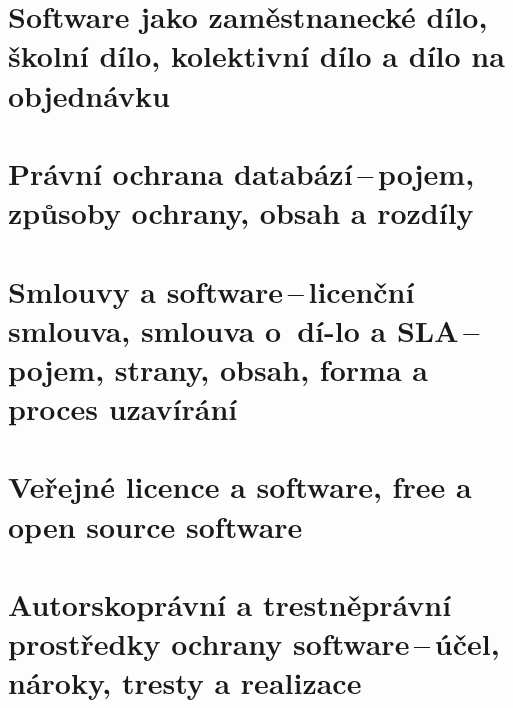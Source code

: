 \newpage
\section{Software jako zaměstnanecké dílo, školní dílo, kolektivní dílo a dílo na objednávku}

\newpage
\section{Právní ochrana databází\,--\,pojem, způsoby ochrany, obsah a rozdíly}

\newpage
\section[Smlouvy a software\,--\,licenční smlouva, smlouva o~dílo a SLA\,--\,pojem, strany, obsah, forma a proces uzavírání]{Smlouvy a software\,--\,licenční smlouva, smlouva o~dí-lo a SLA\,--\,pojem, strany, obsah, forma a proces uzavírání}

\newpage
\section{Veřejné licence a software, free a open source software}

\newpage
\section{Autorskoprávní a trestněprávní prostředky ochrany software\,--\,účel, nároky, tresty a realizace}

\newpage